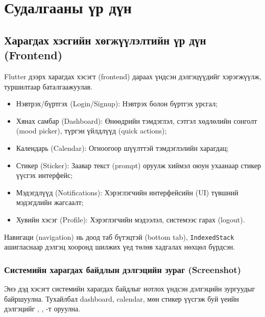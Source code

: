 \chapter{Судалгааны үр дүн}
\label{ch:results}

\section{Харагдах хэсгийн хөгжүүлэлтийн үр дүн (Frontend)}
\label{sec:frontend_results}

Flutter дээрх харагдах хэсэгт (frontend) дараах үндсэн дэлгэцүүдийг хэрэгжүүлж, туршилтаар баталгаажуулав.

\begin{itemize}
    \item Нэвтрэх/бүртгэх (Login/Signup): Нэвтрэх болон бүртгэх урсгал;
    \item Хянах самбар (Dashboard): Өнөөдрийн тэмдэглэл, сэтгэл хөдлөлийн сонголт (mood picker), түргэн үйлдлүүд (quick actions);
    \item Календарь (Calendar): Огноогоор шүүлттэй тэмдэглэлийн харагдац;
    \item Стикер (Sticker): Заавар текст (prompt) оруулж хиймэл оюун ухаанаар стикер үүсгэх интерфейс;
    \item Мэдэгдлүүд (Notifications): Хэрэглэгчийн интерфейсийн (UI) түвшний мэдэгдлийн жагсаалт;
    \item Хувийн хэсэг (Profile): Хэрэглэгчийн мэдээлэл, системээс гарах (logout).
\end{itemize}

Навигаци (navigation) нь доод таб бүтэцтэй (bottom tab), \texttt{IndexedStack} ашигласнаар дэлгэц хооронд шилжих үед төлөв хадгалах нөхцөл бүрдсэн.

\subsection{Системийн харагдах байдлын дэлгэцийн зураг (Screenshot)}
\label{subsec:frontend_screenshots}

Энэ дэд хэсэгт системийн харагдах байдлыг нотлох үндсэн дэлгэцийн зургуудыг байршуулна. Тухайлбал dashboard, calendar, мөн стикер үүсгэж буй үеийн дэлгэцийг , , -т оруулна.

